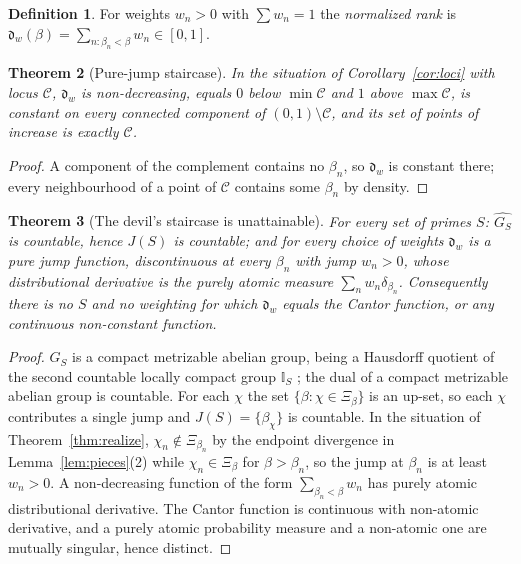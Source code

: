 \documentclass[11pt]{amsart}
\numberwithin{equation}{section}
\newtheorem{theorem}{Theorem}[section]
\theoremstyle{definition}
\newtheorem{definition}[theorem]{Definition}
\theoremstyle{remark}
\newcommand{\cC}{\mathcal{C}}
\newcommand{\dw}{\mathfrak{d}}
\begin{document}
\begin{definition}\label{def:order}
For weights $w_n>0$ with $\sum w_n=1$ the \emph{normalized rank} is
$\dw_w(\beta)=\sum_{n:\beta_n<\beta}w_n\in[0,1]$.
\end{definition}

\begin{theorem}[Pure-jump staircase]\label{thm:staircase}
In the situation of Corollary~\ref{cor:loci} with locus $\cC$, $\dw_w$ is non-decreasing,
equals $0$ below $\min\cC$ and $1$ above $\max\cC$, is constant on every connected component
of $(0,1)\setminus\cC$, and its set of points of increase is exactly $\cC$.
\end{theorem}

\begin{proof}
A component of the complement contains no $\beta_n$, so $\dw_w$ is constant there; every
neighbourhood of a point of $\cC$ contains some $\beta_n$ by density.
\end{proof}

\begin{theorem}[The devil's staircase is unattainable]\label{thm:impossible}
For every set of primes $S$: $\widehat{G_S}$ is countable, hence $J(S)$ is countable; and
for every choice of weights $\dw_w$ is a pure jump function, discontinuous at every
$\beta_n$ with jump $w_n>0$, whose distributional derivative is the purely atomic measure
$\sum_nw_n\delta_{\beta_n}$. Consequently there is no $S$ and no weighting for which
$\dw_w$ equals the Cantor function, or any continuous non-constant function.
\end{theorem}

\begin{proof}
$G_S$ is a compact metrizable abelian group, being a Hausdorff quotient of the second
countable locally compact group $\mathbb I_S$ \cite[Prop.~2.5]{Main}; the dual of a compact
metrizable abelian group is countable. For each $\chi$ the set $\{\beta:\chi\in\Xi_\beta\}$ is an up-set, so each $\chi$
contributes a single jump and $J(S)=\{\beta_\chi\}$ is countable. In the situation of
Theorem~\ref{thm:realize}, $\chi_n\notin\Xi_{\beta_n}$ by the endpoint divergence in
Lemma~\ref{lem:pieces}(2) while $\chi_n\in\Xi_\beta$ for $\beta>\beta_n$, so the jump at
$\beta_n$ is at least $w_n>0$. A non-decreasing function of the form
$\sum_{\beta_n<\beta}w_n$ has purely atomic distributional derivative. The Cantor function
is continuous with non-atomic derivative, and a purely atomic probability measure and a
non-atomic one are mutually singular, hence distinct.
\end{proof}
\end{document}
